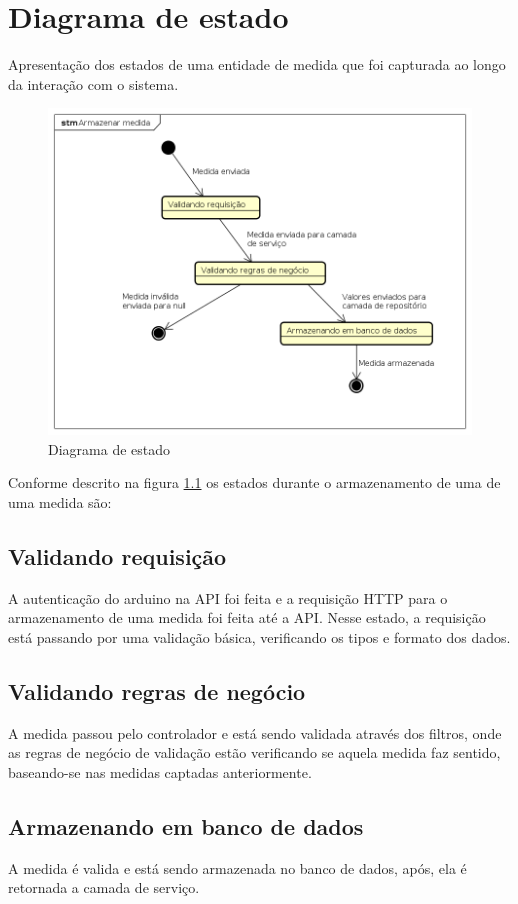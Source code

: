 \chapter{Diagrama de estado}

Apresentação dos estados de uma entidade de medida que foi capturada ao longo da interação com o sistema.

\begin{figure}[H]
    \label{figure_diagrama_estado}
    \centering
    \caption{Diagrama de estado}
    \includegraphics[scale=0.6]{diagrams/estado.png}
    \hfill
\end{figure}

Conforme descrito na figura \ref{figure_diagrama_estado} os estados durante o armazenamento de uma de uma medida são:

\section{Validando requisição}

A autenticação do arduino na API foi feita e a requisição HTTP para o armazenamento de uma medida foi feita até a API.
Nesse estado, a requisição está passando por uma validação básica, verificando os tipos e formato dos dados.

\section{Validando regras de negócio}

A medida passou pelo controlador e está sendo validada através dos filtros, onde as regras de negócio de validação estão verificando se aquela medida faz sentido, baseando-se nas medidas captadas anteriormente.

\section{Armazenando em banco de dados}

A medida é valida e está sendo armazenada no banco de dados, após, ela é retornada a camada de serviço.
